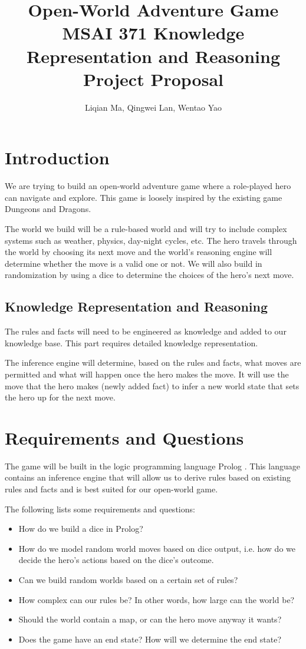\documentclass[10pt]{article}
\title{
    Open-World Adventure Game \\[.5cm]
    \normalsize MSAI 371 Knowledge Representation and Reasoning Project Proposal
}
\author{Liqian Ma, Qingwei Lan, Wentao Yao}
\begin{document}
\maketitle

\section*{Introduction}

We are trying to build an open-world adventure game where a role-played hero can navigate and explore. This game is loosely inspired by the existing game Dungeons and Dragons.

The world we build will be a rule-based world and will try to include complex systems such as weather, physics, day-night cycles, etc. The hero travels through the world by choosing its next move and the world's reasoning engine will determine whether the move is a valid one or not. We will also build in randomization by using a dice to determine the choices of the hero’s next move.

\subsection*{Knowledge Representation and Reasoning}

The rules and facts will need to be engineered as knowledge and added to our knowledge base. This part requires detailed knowledge representation.

The inference engine will determine, based on the rules and facts, what moves are permitted and what will happen once the hero makes the move. It will use the move that the hero makes (newly added fact) to infer a new world state that sets the hero up for the next move.


\section*{Requirements and Questions}

The game will be built in the logic programming language Prolog \cite{swiprolog}. This language contains an inference engine that will allow us to derive rules based on existing rules and facts and is best suited for our open-world game.

The following lists some requirements and questions:

\begin{itemize}
\item How do we build a dice in Prolog?
\item How do we model random world moves based on dice output, i.e. how do we decide the hero’s actions based on the dice’s outcome.
\item Can we build random worlds based on a certain set of rules?
\item How complex can our rules be? In other words, how large can the world be?
\item Should the world contain a map, or can the hero move anyway it wants?
\item Does the game have an end state? How will we determine the end state?
\end{itemize}
\end{document}
